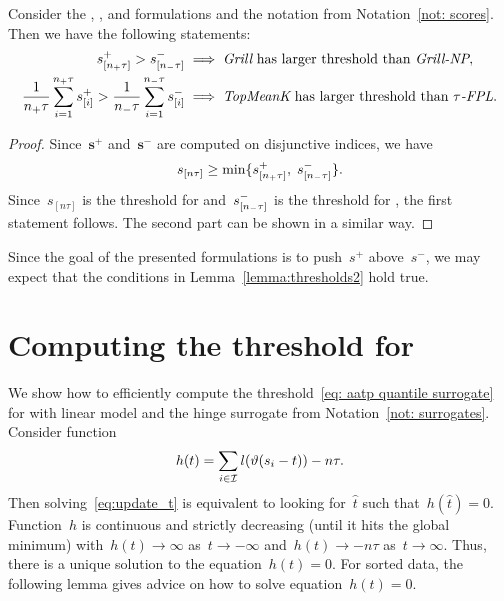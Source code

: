 \begin{lemma}\label{lemma:thresholds2}
  Consider the \Grill, \GrillNP, \TopMeanK and \tauFPL formulations and the notation from Notation~\ref{not: scores}. Then we have the following statements:
  \begin{equation*}
    \begin{aligned}
      s_{[n_{+}\tau]}^+ > s_{[n_{-}\tau]}^-
        & \implies \emph{Grill} \text{ has larger threshold than }\emph{Grill-NP}, \\
      \frac{1}{n_{+}\tau}\sum_{i=1}^{n_{+}\tau} s_{[i]}^+
      > \frac{1}{n_{-}\tau}\sum_{i=1}^{n_{-}\tau} s_{[i]}^-
        & \implies \emph{TopMeanK} \text{ has larger threshold than }{\emph{$\tau$-FPL}}. \\
    \end{aligned}
  \end{equation*}
\end{lemma}

\begin{proof}
  Since~$\bm{s}^+$ and~$\bm{s}^-$ are computed on disjunctive indices, we have
  \begin{equation*}
    s_{[n\tau]} \geq \min\{s_{[n_{+}\tau]}^+, \; s_{[n_{-}\tau]}^-\}.
  \end{equation*}
  Since~$s_{[n\tau]}$ is the threshold for \Grill and~$s_{[n_{-}\tau]}^-$ is the threshold for \GrillNP, the first statement follows. The second part can be shown in a similar way.
\end{proof}
  
\noindent Since the goal of the presented formulations is to push~$s^+$ above~$s^-$, we may expect that the conditions in Lemma~\ref{lemma:thresholds2} hold true. 

\section{Computing the threshold for \PatMat}\label{app:threshold}

We show how to efficiently compute the threshold~\eqref{eq: aatp quantile surrogate} for \PatMat with linear model and the hinge surrogate from Notation~\ref{not: surrogates}. Consider function
\begin{equation}\label{eq:defin_h}
  h(t) = \sum_{i \in \I} l\Brac{\vartheta(s_i - t)} - n\tau.
\end{equation}
Then solving~\eqref{eq:update_t} is equivalent to looking for~$\hat{t}$ such that~$h(\hat{t}) = 0$. Function~$h$ is continuous and strictly decreasing (until it hits the global minimum) with~$h(t) \to \infty$ as~$t \to -\infty$ and~$h(t) \to -n\tau$ as~$t \to \infty$. Thus, there is a unique solution to the equation~$h(t) = 0$. For sorted data, the following lemma gives advice on how to solve equation~$h(t) = 0$. 

